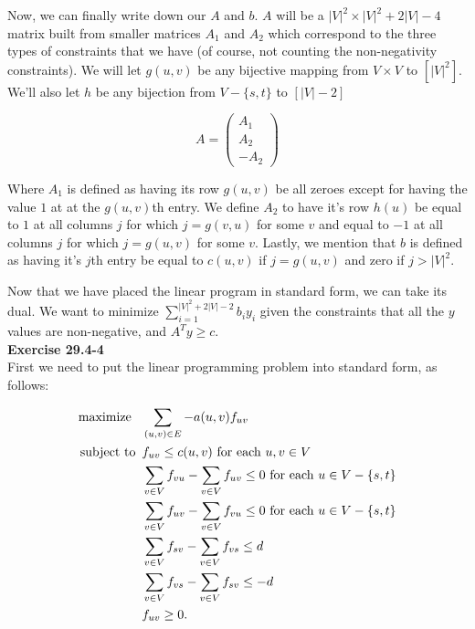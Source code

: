 \documentclass{article}
\begin{document}
Now, we can finally write down our $A$ and $b$. $A$ will be a $|V|^2 \times |V|^2 + 2|V| -4$ matrix built from smaller matrices $A_1$ and $A_2$ which correspond to the three types of constraints that we have (of course, not counting the non-negativity constraints). We will let $g(u,v)$ be any bijective mapping from $V\times V$ to $\left[|V|^2\right]$. We'll also let $h$ be any bijection from $V- \{s,t\}$ to $[|V|-2]$

\[
A = \left(\begin{array}{c}
A_1\\
A_2\\
-A_2
\end{array}\right)
\]

Where $A_1$ is defined as having its row $g(u,v)$ be all zeroes except for having the value $1$ at at the $g(u,v)$th entry. We define $A_2$ to have it's row $h(u)$ be equal to $1$ at all columns $j$ for which $j=g(v,u)$ for some $v$ and equal to $-1$ at all columns $j$ for which $j= g(u,v)$ for some $v$. Lastly, we mention that $b$ is defined as having it's $j$th entry be equal to $c(u,v)$ if $j =g(u,v)$ and zero if $j > |V|^2$.

Now that we have placed the linear program in standard form, we can take its dual. We want to minimize $\sum_{i=1}^{|V|^2+2|V|-2} b_i y_i$ given the constraints that all the $y$ values are non-negative, and $A^T y \ge c$.\\

\noindent\textbf{Exercise 29.4-4}\\

First we need to put the linear programming problem into standard form, as follows:

\begin{align*}
\mbox{maximize \,\,\,} & \sum_{(u,v) \in E} -a(u,v)f_{uv}\\
\mbox{subject to \,} & f_{uv} \leq c(u,v) \mbox{ for each } u,v \in V \\
& \sum_{v \in V} f_{vu} - \sum_{v \in V} f_{uv} \leq 0 \mbox{ for each } u \in V - \{s,t\} \\
& \sum_{v \in V} f_{uv} - \sum_{v \in V} f_{vu} \leq 0 \mbox{ for each } u \in V - \{s,t\} \\
& \sum_{v \in V} f_{sv} - \sum_{v \in V} f_{vs} \leq d \\
& \sum_{v \in V} f_{vs} - \sum_{v \in V} f_{sv} \leq -d \\ 
& f_{uv} \geq 0.\\
\end{align*}
\end{document}
